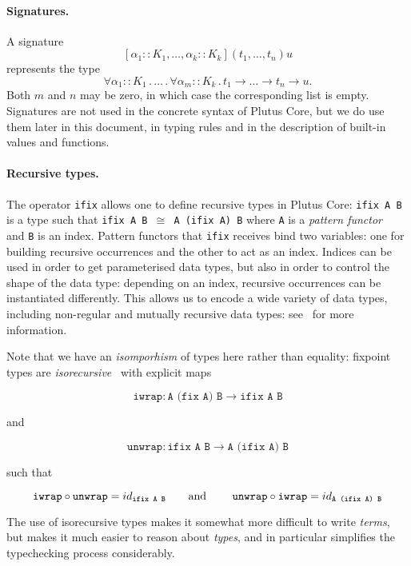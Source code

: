 \documentclass[a4paper]{article}
\begin{document}
\paragraph{Signatures.}  A signature
$$[\alpha_1::K_1, \ldots, \alpha_k::K_k](t_1, \ldots, t_n)u$$ represents
the type
$$\forall \alpha_1::K_1\,.\, \ldots \,.\, \forall \alpha_m::K_k\,.\, t_1
\rightarrow \ldots \rightarrow t_n \rightarrow u.$$
Both $m$ and $n$
may be zero, in which case the corresponding list is empty.
Signatures are not used in the concrete syntax of Plutus Core, but we
do use them later in this document, in typing rules and in the
description of built-in values and functions.

\paragraph{Recursive types.}
\label{sec:ifix-note}
\noindent
The operator \texttt{ifix} allows one to define recursive types in
Plutus Core: \texttt{ifix A B} is a type such that \texttt{ifix A B
  $\cong$ A (ifix A) B} where \texttt{A} is a \textit{pattern
  functor}~\citep[2.4]{backhouseetal98} and \texttt{B} is an
index. Pattern functors that \texttt{ifix} receives bind two
variables: one for building recursive occurrences and the other to act
as an index. Indices can be used in order to get parameterised data
types, but also in order to control the shape of the data type:
depending on an index, recursive occurrences can be instantiated
differently.  This allows us to encode a wide variety of data types,
including non-regular and mutually recursive data types:
see~\citep[3.1]{unravelling-recursion} for more information.

Note that we have an \textit{isomporhism} of types here rather than
equality: fixpoint types are
\textit{isorecursive}~\citep[20.2]{Pierce:TAPL} with explicit maps

$$
\texttt{iwrap} : \texttt{A (fix A) B} \rightarrow \texttt{ifix A B}
$$

\noindent and

$$
\texttt{unwrap} : \texttt{ifix A B} \rightarrow  \texttt{A (ifix A) B}
$$

\noindent such that

$$
\texttt{iwrap} \circ \texttt{unwrap} = id_{ \texttt{ifix A B}}
\mbox{\qquad and \qquad}
\texttt{unwrap} \circ \texttt{iwrap} = id_{ \texttt{A (ifix A) B}}
$$

\noindent The use of isorecursive types makes it somewhat more difficult to
write \textit{terms}, but makes it much easier to reason about
\textit{types}, and in particular simplifies the typechecking process
considerably.
\end{document}
